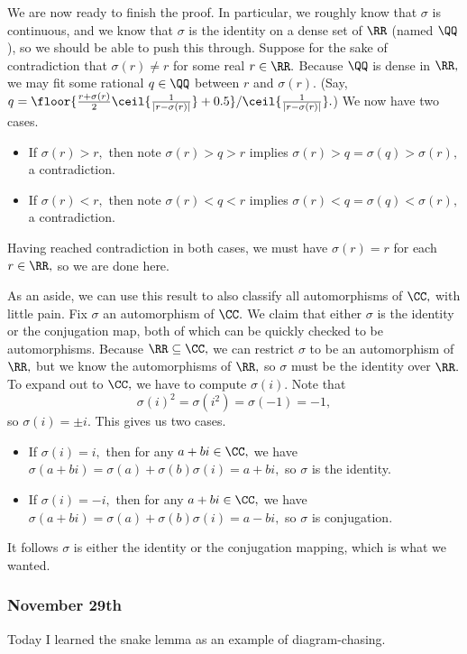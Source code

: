 We are now ready to finish the proof. In particular, we roughly know that $\sigma$ is continuous, and we know that $\sigma$ is the identity on a dense set of $\RR$ (named $\QQ$), so we should be able to push this through. Suppose for the sake of contradiction that $\sigma(r)\ne r$ for some real $r\in\RR.$ Because $\QQ$ is dense in $\RR,$ we may fit some rational $q\in\QQ$ between $r$ and $\sigma(r).$ (Say, $q=\floor{\frac{r+\sigma(r)}2\ceil{\frac1{|r-\sigma(r)|}}+0.5}/\ceil{\frac1{|r-\sigma(r)|}}.$) We now have two cases.
\begin{itemize}
    \item If $\sigma(r)>r,$ then note $\sigma(r)>q>r$ implies $\sigma(r)>q=\sigma(q)>\sigma(r),$ a contradiction.
    \item If $\sigma(r)<r,$ then note $\sigma(r)<q<r$ implies $\sigma(r)<q=\sigma(q)<\sigma(r),$ a contradiction.
\end{itemize}
Having reached contradiction in both cases, we must have $\sigma(r)=r$ for each $r\in\RR,$ so we are done here.

As an aside, we can use this result to also classify all automorphisms of $\CC,$ with little pain. Fix $\sigma$ an automorphism of $\CC.$ We claim that either $\sigma$ is the identity or the conjugation map, both of which can be quickly checked to be automorphisms. Because $\RR\subseteq\CC,$ we can restrict $\sigma$ to be an automorphism of $\RR,$ but we know the automorphisms of $\RR,$ so $\sigma$ must be the identity over $\RR.$ To expand out to $\CC,$ we have to compute $\sigma(i).$ Note that
\[\sigma(i)^2=\sigma\left(i^2\right)=\sigma(-1)=-1,\]
so $\sigma(i)=\pm i.$ This gives us two cases.
\begin{itemize}
    \item If $\sigma(i)=i,$ then for any $a+bi\in\CC,$ we have $\sigma(a+bi)=\sigma(a)+\sigma(b)\sigma(i)=a+bi,$ so $\sigma$ is the identity.
    \item If $\sigma(i)=-i,$ then for any $a+bi\in\CC,$ we have $\sigma(a+bi)=\sigma(a)+\sigma(b)\sigma(i)=a-bi,$ so $\sigma$ is conjugation.
\end{itemize}
It follows $\sigma$ is either the identity or the conjugation mapping, which is what we wanted.

\subsubsection{November 29th}
Today I learned the snake lemma as an example of diagram-chasing.

